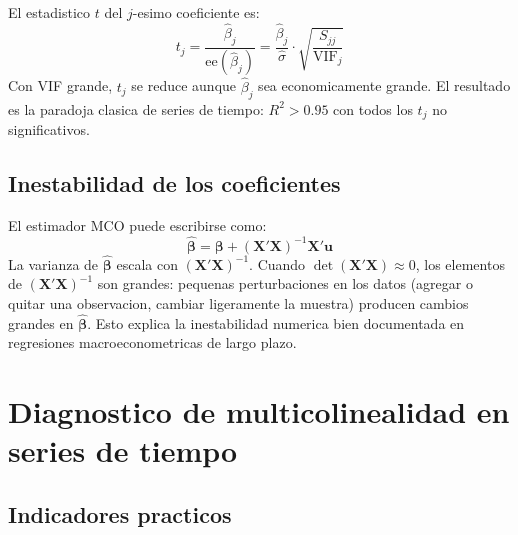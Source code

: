 \documentclass[12pt, letterpaper]{article}
\theoremstyle{remark}
\begin{document}
El estadistico $t$ del $j$-esimo coeficiente es:
\begin{equation}
  t_j = \frac{\hat\beta_j}{\text{ee}(\hat\beta_j)}
       = \frac{\hat\beta_j}{\hat\sigma} \cdot \sqrt{\frac{S_{jj}}{\text{VIF}_j}}
  \label{eq:t_stat}
\end{equation}
Con VIF grande, $t_j$ se reduce aunque $\hat\beta_j$ sea economicamente grande.
El resultado es la paradoja clasica de series de tiempo: $R^2 > 0.95$ con
todos los $t_j$ no significativos.

\subsection{Inestabilidad de los coeficientes}

El estimador MCO puede escribirse como:
\begin{equation}
  \hat{\boldsymbol{\beta}} = \boldsymbol{\beta} + (\mathbf{X'X})^{-1}\mathbf{X'u}
  \label{eq:beta_error}
\end{equation}
La varianza de $\hat{\boldsymbol{\beta}}$ escala con $(\mathbf{X'X})^{-1}$.
Cuando $\det(\mathbf{X'X}) \approx 0$, los elementos de $(\mathbf{X'X})^{-1}$
son grandes: pequenas perturbaciones en los datos (agregar o quitar una
observacion, cambiar ligeramente la muestra) producen cambios grandes en
$\hat{\boldsymbol{\beta}}$. Esto explica la inestabilidad numerica bien
documentada en regresiones macroeconometricas de largo plazo.

\section{Diagnostico de multicolinealidad en series de tiempo}

\subsection{Indicadores practicos}
\end{document}
